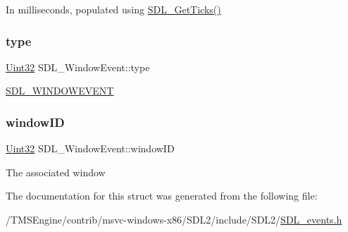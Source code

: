 In milliseconds, populated using \hyperlink{_s_d_l__timer_8h_a0b9bc71d6287e0ffafdc3419760fe2b3}{S\+D\+L\+\_\+\+Get\+Ticks()} \mbox{\label{struct_s_d_l___window_event_a01c8c8fbe8564e690f958d2db560f657}} 
\subsubsection{\texorpdfstring{type}{type}}
{\footnotesize\ttfamily \hyperlink{_s_d_l__stdinc_8h_add440eff171ea5f55cb00c4a9ab8672d}{Uint32} S\+D\+L\+\_\+\+Window\+Event\+::type}

\hyperlink{_s_d_l__events_8h_a3b589e89be6b35c02e0dd34a55f3fccaa5ff4e41f0d8b5def11cfe6a69ec0b698}{S\+D\+L\+\_\+\+W\+I\+N\+D\+O\+W\+E\+V\+E\+NT} \mbox{\label{struct_s_d_l___window_event_a4b31796ffc84fbb7f6e9ba33e127619a}} 
\subsubsection{\texorpdfstring{window\+ID}{windowID}}
{\footnotesize\ttfamily \hyperlink{_s_d_l__stdinc_8h_add440eff171ea5f55cb00c4a9ab8672d}{Uint32} S\+D\+L\+\_\+\+Window\+Event\+::window\+ID}

The associated window 

The documentation for this struct was generated from the following file\+:\begin{DoxyCompactItemize}
\item 
/\+T\+M\+S\+Engine/contrib/msvc-\/windows-\/x86/\+S\+D\+L2/include/\+S\+D\+L2/\hyperlink{_s_d_l__events_8h}{S\+D\+L\+\_\+events.\+h}\end{DoxyCompactItemize}
